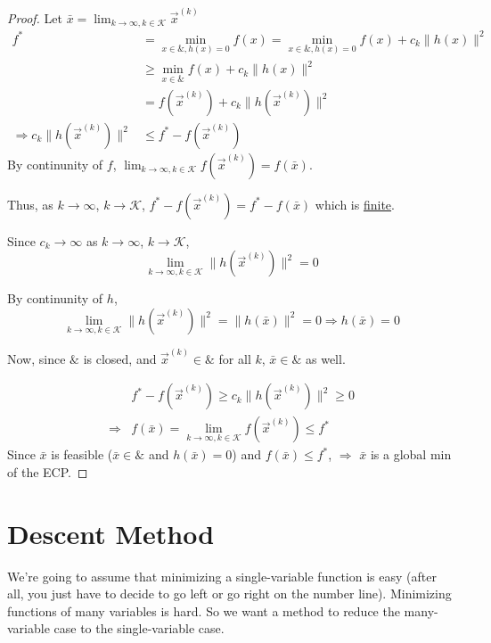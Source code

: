 \documentclass[11pt]{elegantbook}
\begin{document}
\begin{proof}
    Let $\bar{x}=\lim_{k \rightarrow \infty, k\in \mathcal{K}}\vec{x}^{(k)}$
    \begin{equation}
        \begin{aligned}
            f^*&=\min_{x\in\&,h(x)=0}f(x)=\min_{x\in\&,h(x)=0}f(x)+c_k\|h(x)\|^2\\
            &\geq \min_{x\in\&}f(x)+c_k\|h(x)\|^2\\
            &=f(\vec{x}^{(k)})+c_k\|h(\vec{x}^{(k)})\|^2\\
            \Rightarrow	c_k\|h(\vec{x}^{(k)})\|^2&\leq f^*-f(\vec{x}^{(k)})
        \end{aligned}
        \nonumber
    \end{equation}
    By continunity of $f$, $\lim_{k \rightarrow \infty, k\in \mathcal{K}}f(\vec{x}^{(k)})=f(\bar{x})$.

    Thus, as $k \rightarrow	\infty$, $k \rightarrow	\mathcal{K}$, $f^*-f(\vec{x}^{(k)})=f^*-f(\bar{x})$ which is \underline{finite}.

    Since $c_k \rightarrow \infty$ as $k \rightarrow	\infty$, $k \rightarrow	\mathcal{K}$, $$\lim_{k \rightarrow \infty, k\in \mathcal{K}}\|h(\vec{x}^{(k)})\|^2=0$$

    By continunity of $h$,
    $$\lim_{k \rightarrow \infty, k\in \mathcal{K}}\|h(\vec{x}^{(k)})\|^2=\|h(\bar{x})\|^2=0 \Rightarrow	h(\bar{x})=0$$

    Now, since $\&$ is closed, and $\vec{x}^{(k)}\in \&$ for all $k$, $\bar{x}\in\&$ as well.

    \begin{equation}
        \begin{aligned}
            &f^*-f(\vec{x}^{(k)})\geq c_k\|h(\vec{x}^{(k)})\|^2\geq 0\\
            \Rightarrow	& f(\bar{x})=\lim_{k \rightarrow \infty, k\in \mathcal{K}}f(\vec{x}^{(k)})\leq f^*
        \end{aligned}
        \nonumber
    \end{equation}
    Since $\bar{x}$ is feasible ($\bar{x}\in\&$ and $h(\bar{x})=0$) and $f(\bar{x})\leq f^*$, $\Rightarrow$ $\bar{x}$ is a global min of the ECP.
\end{proof}


\chapter{Descent Method}
We're going to assume that minimizing a single-variable function is easy (after all, you just have to decide to go left or go right on the number line). Minimizing functions of many variables is hard. So we want a method to reduce the many-variable case to the single-variable case.
\end{document}
